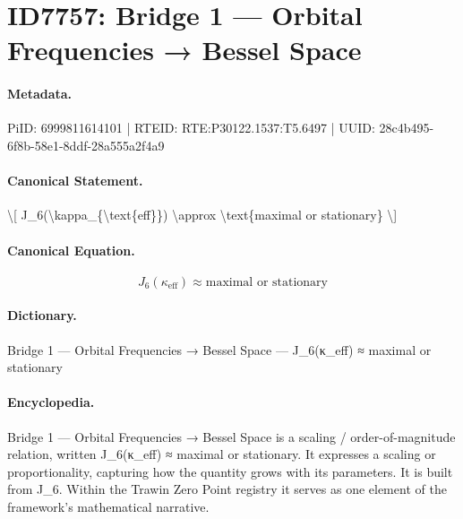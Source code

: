 \section*{ID7757: Bridge 1 — Orbital Frequencies → Bessel Space}
\paragraph{Metadata.}
PiID: 6999811614101 | RTEID: RTE:P30122.1537:T5.6497 | UUID: 28c4b495-6f8b-58e1-8ddf-28a555a2f4a9

\paragraph{Canonical Statement.}
\textbackslash{}[ J\_6(\textbackslash{}kappa\_\{\textbackslash{}text\{eff\}\}) \textbackslash{}approx \textbackslash{}text\{maximal or stationary\} \textbackslash{}]

\paragraph{Canonical Equation.}
\[
J_6(\kappa_{\text{eff}}) \approx \text{maximal or stationary}
\]

\paragraph{Dictionary.}
Bridge 1 — Orbital Frequencies → Bessel Space — J\_6(κ\_eff) ≈ maximal or stationary

\paragraph{Encyclopedia.}
Bridge 1 — Orbital Frequencies → Bessel Space is a scaling / order-of-magnitude relation, written J\_6(κ\_eff) ≈ maximal or stationary. It expresses a scaling or proportionality, capturing how the quantity grows with its parameters. It is built from J\_6. Within the Trawin Zero Point registry it serves as one element of the framework's mathematical narrative.
